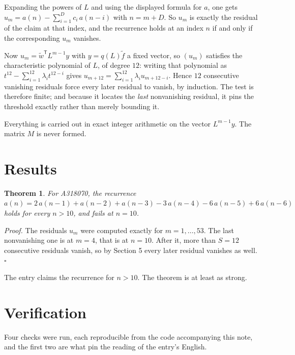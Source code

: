 \documentclass[11pt]{article}
\newtheorem{theorem}{Theorem}
\theoremstyle{definition}
\begin{document}
Expanding the powers of $L$ and using the displayed formula for $a$, one gets $u_m = a(n) - \sum_{i=1}^{D} c_i\,a(n-i)$ with $n = m + D$. So $u_m$ is exactly the residual of the claim at that index, and the recurrence holds at an index $n$ if and only if the corresponding $u_m$ vanishes.

Now $u_m = \tilde w^{\mathsf T} L^{m-1} y$ with $y = q(L)\tilde f$ a fixed vector, so $(u_m)$ satisfies the characteristic polynomial of $L$, of degree $12$: writing that polynomial as $t^{12} - \sum_{i=1}^{12} \lambda_i t^{12-i}$ gives $u_{m+12} = \sum_{i=1}^{12} \lambda_i u_{m+12-i}$. Hence $12$ consecutive vanishing residuals force every later residual to vanish, by induction. The test is therefore finite; and because it locates the {\itshape last} nonvanishing residual, it pins the threshold exactly rather than merely bounding it.

Everything is carried out in exact integer arithmetic on the vector $L^{m-1}y$. The matrix $M$ is never formed.

\section{Results}

\begin{theorem} For A318070, the recurrence $a(n) = 2\,a(n-1) + a(n-2) + a(n-3) - 3\,a(n-4) - 6\,a(n-5) + 6\,a(n-6)$ holds for every $n > 10$, and fails at $n = 10$.\end{theorem}

{\itshape Proof.} The residuals $u_m$ were computed exactly for $m = 1,\dots,53$. The last nonvanishing one is at $m = 4$, that is at $n = 10$. After it, more than $S = 12$ consecutive residuals vanish, so by Section 5 every later residual vanishes as well. $\square$

The entry claims the recurrence for $n > 10$. The theorem is at least as strong.

\section{Verification}

Four checks were run, each reproducible from the code accompanying this note, and the first two are what pin the reading of the entry's English.
\end{document}
